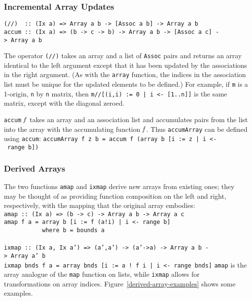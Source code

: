 {\subsubsection{Incremental Array Updates}

\bprogB
\mbox{\tt (//)\ \ ::\ (Ix\ a)\ =>\ Array\ a\ b\ ->\ [Assoc\ a\ b]\ ->\ Array\ a\ b}\\
\mbox{\tt accum\ ::\ (Ix\ a)\ =>\ (b\ ->\ c\ ->\ b)\ ->\ Array\ a\ b\ ->\ [Assoc\ a\ c]\ ->\ Array\ a\ b}
\eprogNoSkip\indextt{//}

The operator \mbox{\tt (//)} takes an array and a list of \mbox{\tt Assoc} pairs and returns
an array identical to the left argument except that it has
been updated by the associations in the right argument.  (As with
the \mbox{\tt array} function, the indices in the association list must
be unique for the updated elements to be defined.)  For example,
if \mbox{\tt m} is a 1-origin, \mbox{\tt n} by \mbox{\tt n} matrix, then
\mbox{\tt m//[(i,i)\ :=\ 0\ |\ i\ <-\ [1..n]]} is the same matrix, except with
the diagonal zeroed.

\mbox{\tt accum} \mbox{$\it f$} takes an array
and an association list and accumulates pairs from the list into
the array with the accumulating function \mbox{$\it f$}.  Thus \mbox{\tt accumArray}
can be defined using \mbox{\tt accum}:\nopagebreak[4]
\bprog
\mbox{\tt accumArray\ f\ z\ b\ =\ accum\ f\ (array\ b\ [i\ :=\ z\ |\ i\ <-\ range\ b])}
\eprogNoSkip

\subsubsection{Derived Arrays}

The two functions \mbox{\tt amap} and \mbox{\tt ixmap}
derive new arrays from existing ones; they may be
thought of as providing function composition on the left and right,
respectively, with the mapping that the original array embodies:
\bprog
\mbox{\tt amap\ ::\ (Ix\ a)\ =>\ (b\ ->\ c)\ ->\ Array\ a\ b\ ->\ Array\ a\ c}\\
\mbox{\tt amap\ f\ a\ =\ array\ b\ [i\ :=\ f\ (a!i)\ |\ i\ <-\ range\ b]}\\
\mbox{\tt \ \ \ \ \ \ \ \ \ \ \ where\ b\ =\ bounds\ a}\\
\mbox{\tt }\\[-8pt]
\mbox{\tt ixmap\ ::\ (Ix\ a,\ Ix\ a')\ =>\ (a',a')\ ->\ (a'->a)\ ->\ Array\ a\ b\ ->\ Array\ a'\ b}\\
\mbox{\tt ixmap\ bnds\ f\ a\ =\ array\ bnds\ [i\ :=\ a\ !\ f\ i\ |\ i\ <-\ range\ bnds]}
\eprog{}%
\mbox{\tt amap} is the array analogue of the \mbox{\tt map} function on lists, while
\mbox{\tt ixmap} allows for transformations on array indices.
Figure~\ref{derived-array-examples} shows some examples.

}
